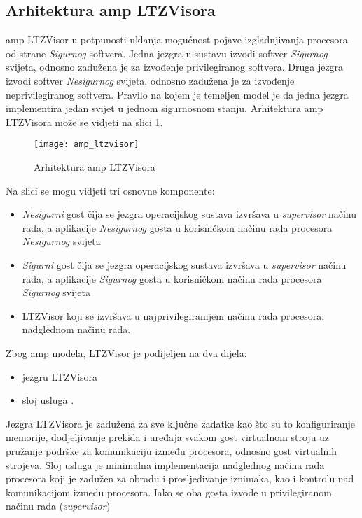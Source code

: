 \documentclass[times, utf8, diplomski, numeric]{fer}
\begin{document}
\subsection{Arhitektura \gls{amp} LTZVisora}
\gls{amp} LTZVisor u potpunosti uklanja mogućnost pojave izgladnjivanja procesora od strane \textit{Sigurnog} softvera. Jedna jezgra
u sustavu izvodi softver \textit{Sigurnog} svijeta, odnosno zadužena je za izvođenje privilegiranog softvera. Druga jezgra
izvodi softver \textit{Nesigurnog} svijeta, odnosno zadužena je za izvođenje neprivilegiranog softvera. Pravilo na kojem je
temeljen model je da jedna jezgra implementira jedan svijet u jednom sigurnosnom stanju. Arhitektura \gls{amp} LTZVisora može se
vidjeti na slici \ref{amp_ltzvisor}.
\begin{figure}[H]
  \centering
  \texttt{[image: amp\_ltzvisor]}
  \caption{Arhitektura \gls{amp} LTZVisora \cite{amp_ltzvisor}}
  \label{amp_ltzvisor}
\end{figure}
Na slici se mogu vidjeti tri osnovne komponente:
\begin{itemize}
  \item {\textit{Nesigurni} gost čija se jezgra operacijskog sustava izvršava u \textit{supervisor} načinu rada, a aplikacije
  \textit{Nesigurnog} gosta u korisničkom načinu rada procesora \textit{Nesigurnog} svijeta}
  \item{\textit{Sigurni} gost čija se jezgra operacijskog sustava izvršava u \textit{supervisor} načinu rada, a aplikacije
  \textit{Sigurnog} gosta u korisničkom načinu rada procesora \textit{Sigurnog} svijeta}
  \item{LTZVisor koji se izvršava u najprivilegiranijem načinu rada procesora: nadglednom načinu rada.}
\end{itemize}
\newpage
Zbog \gls{amp} modela, LTZVisor je podijeljen na dva dijela:
\begin{itemize}
  \item {jezgru LTZVisora}
  \item{sloj usluga .}
\end{itemize}
Jezgra LTZVisora je zadužena za sve ključne zadatke kao što su to konfiguriranje memorije, dodjeljivanje prekida i uređaja
svakom gost virtualnom stroju uz pružanje podrške za komunikaciju između procesora, odnosno gost virtualnih strojeva.
Sloj usluga je minimalna implementacija nadglednog načina rada procesora koji je zadužen za obradu i prosljeđivanje iznimaka,
kao i kontrolu nad komunikacijom između procesora. Iako se oba gosta izvode u privilegiranom načinu rada (\textit{supervisor})
\end{document}
